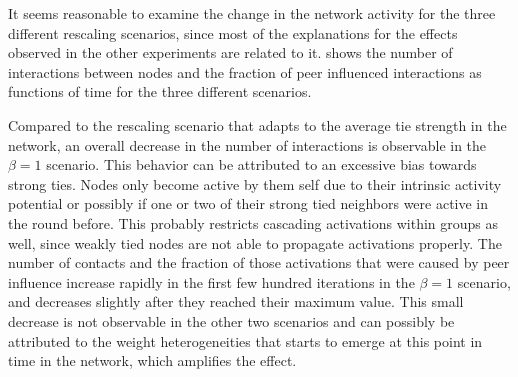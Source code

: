 It seems reasonable to examine the change in the network activity for the three different rescaling scenarios, since most of the explanations for the effects observed in the other experiments are related to it.
 shows the number of interactions between nodes and the fraction of peer influenced interactions as functions of time for the three different scenarios.

Compared to the rescaling scenario that adapts to the average tie strength in the network, an overall decrease in the number of interactions is observable in the \( \beta = 1 \) scenario.
This behavior can be attributed to an excessive bias towards strong ties.
Nodes only become active by them self due to their intrinsic activity potential or possibly if one or two of their strong tied neighbors were active in the round before.
This probably restricts cascading activations within groups as well, since weakly tied nodes are not able to propagate activations properly.
The number of contacts and the fraction of those activations that were caused by peer influence increase rapidly in the first few hundred iterations in the \( \beta = 1 \) scenario, and decreases slightly after they reached their maximum value.
This small decrease is not observable in the other two scenarios and can possibly be attributed to the weight heterogeneities that starts to emerge at this point in time in the network, which amplifies the effect.


